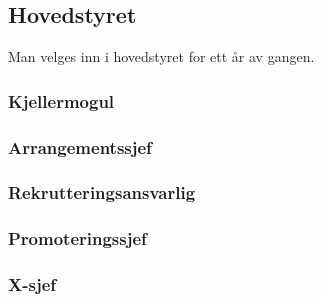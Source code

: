 \documentclass[10pt,norsk,a4paper,usenames,dvipsnames]{article}
\begin{document}
    \begin{minipage}[t]{0.49\textwidth}
        \subsection{Hovedstyret}
            Man velges inn i hovedstyret for ett år av gangen.
        
        
        \subsubsection{Kjellermogul}
        
        
        \subsubsection{Arrangementssjef}
        
        
        \subsubsection{Rekrutteringsansvarlig}
        
        
        \subsubsection{Promoteringssjef}
        
        
        \subsubsection{X-sjef}
            
            
    \end{minipage}
\end{document}
